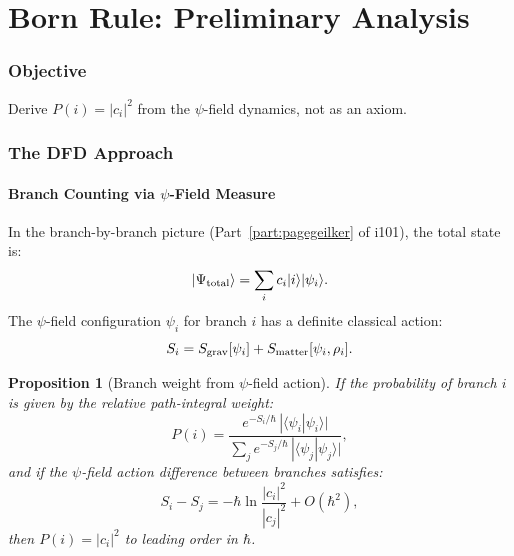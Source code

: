 \documentclass[11pt,a4paper]{article}
\newtheorem{proposition}[theorem]{Proposition}
\theoremstyle{remark}
\begin{document}
\newpage
\part{Born Rule: Preliminary Analysis}
\label{part:born-rule}

\section{Objective}

Derive $P(i) = |c_i|^2$ from the $\psi$-field dynamics, not as an axiom.

\section{The DFD Approach}

\subsection{Branch Counting via $\psi$-Field Measure}

In the branch-by-branch picture (Part~\ref{part:pagegeilker} of i101), the
total state is:
\begin{equation}
|\Psi_{\rm total}\rangle = \sum_i c_i |i\rangle|\psi_i\rangle.
\end{equation}
The $\psi$-field configuration $\psi_i$ for branch $i$ has a definite
classical action:
\begin{equation}
S_i = S_{\rm grav}[\psi_i] + S_{\rm matter}[\psi_i, \rho_i].
\end{equation}

\begin{proposition}[Branch weight from $\psi$-field action]
\label{prop:born-attempt}
If the probability of branch $i$ is given by the relative path-integral
weight:
\begin{equation}
P(i) = \frac{e^{-S_i/\hbar}\,|\langle\psi_i|\psi_i\rangle|}{\sum_j e^{-S_j/\hbar}\,|\langle\psi_j|\psi_j\rangle|},
\label{eq:born-attempt}
\end{equation}
and if the $\psi$-field action difference between branches satisfies:
\begin{equation}
S_i - S_j = -\hbar\ln\frac{|c_i|^2}{|c_j|^2} + O(\hbar^2),
\end{equation}
then $P(i) = |c_i|^2$ to leading order in $\hbar$.
\end{proposition}
\end{document}
